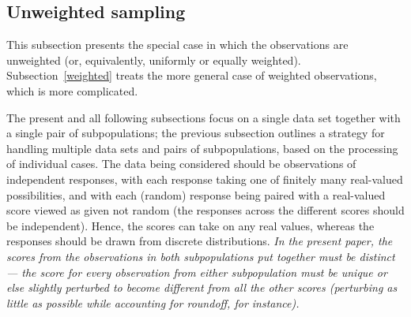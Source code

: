 \documentclass{article}
\begin{document}
\subsection{Unweighted sampling}
\label{unweighted}

This subsection presents the special case in which the observations
are unweighted (or, equivalently, uniformly or equally weighted).
Subsection~\ref{weighted} treats the more general case
of weighted observations, which is more complicated.

The present and all following subsections focus on a single data set
together with a single pair of subpopulations;
the previous subsection outlines a strategy for handling multiple data sets
and pairs of subpopulations, based on the processing of individual cases.
The data being considered should be observations of independent responses,
with each response taking one of finitely many real-valued possibilities,
and with each (random) response being paired with a real-valued score
viewed as given not random
(the responses across the different scores should be independent).
Hence, the scores can take on any real values,
whereas the responses should be drawn from discrete distributions.
{\it In the present paper, the scores from the observations
in both subpopulations put together must be distinct
--- the score for every observation from either subpopulation must be unique
or else slightly perturbed to become different from all the other scores
(perturbing as little as possible while accounting for roundoff,
for instance).}
\end{document}
